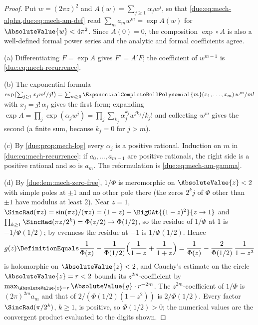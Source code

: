 \documentclass[11pt,oneside]{article}
\theoremstyle{plain}
\theoremstyle{definition}
\theoremstyle{remark}
\newcommand{\PhiUp}{\Phi}                                   %
\newcommand{\am}[1]{a_{#1}}                                 %
\begin{document}
\begin{proof}
Put \(w=(2\pi z)^{2}\) and \(A(w)=\sum_{j\ge1}\alpha_jw^{j}\), so that
\cref{due:eq:mech-alpha,due:eq:mech-am-def} read
\(\sum_m\am{m}w^{m}=\exp A(w)\) for \(\AbsoluteValue{w}<4\pi^{2}\).  Since
\(A(0)=0\), the composition \(\exp\circ A\) is also a well-defined formal
power series and the analytic and formal coefficients agree.

(a) Differentiating \(F=\exp A\) gives \(F'=A'F\); the coefficient of
\(w^{m-1}\) is \cref{due:eq:mech-recurrence}.

(b) The exponential formula
\(\exp\bigl(\sum_{j\ge1}x_jw^{j}/j!\bigr)
=\sum_{m\ge0}\ExponentialCompleteBellPolynomial{m}(x_1,\ldots,x_m)\,w^{m}/m!\)
with \(x_j=j!\,\alpha_j\) gives the first form; expanding
\(\exp A=\prod_j\exp(\alpha_jw^{j})=\prod_j\sum_{k_j}\alpha_j^{k_j}w^{jk_j}/k_j!\)
and collecting \(w^{m}\) gives the second (a finite sum, because
\(k_j=0\) for \(j>m\)).

(c) By \cref{due:prop:mech-log} every \(\alpha_j\) is a positive rational.
Induction on \(m\) in \cref{due:eq:mech-recurrence}: if
\(\am{0},\ldots,\am{m-1}\) are positive rationals, the right side is a
positive rational and so is \(\am{m}\).  The reformulation is
\cref{due:eq:mech-am-gamma}.

(d) By \cref{due:lem:mech-zero-free}, \(1/\PhiUp\) is meromorphic on
\(\AbsoluteValue{z}<2\) with simple poles at \(\pm1\) and no other pole there
(the zeros \(2^{k}j\) of \(\PhiUp\) other than \(\pm1\) have modulus at least
\(2\)).  Near \(z=1\), \(\SincRad(\pi z)=\sin(\pi z)/(\pi z)=(1-z)+\BigOAt{(1-z)^{2}}{z\to1}\)
and \(\prod_{k\ge1}\SincRad(\pi z/2^{k})=\PhiUp(z/2)\to\PhiUp(1/2)\), so the
residue of \(1/\PhiUp\) at \(1\) is \(-1/\PhiUp(1/2)\); by evenness the
residue at \(-1\) is \(1/\PhiUp(1/2)\).  Hence
\[
 g(z)\DefinitionEquals\frac1{\PhiUp(z)}-\frac1{\PhiUp(1/2)}
 \Bigl(\frac1{1-z}+\frac1{1+z}\Bigr)
 =\frac1{\PhiUp(z)}-\frac{2}{\PhiUp(1/2)}\,\frac1{1-z^{2}}
\]
is holomorphic on \(\AbsoluteValue{z}<2\), and Cauchy's estimate on the
circle \(\AbsoluteValue{z}=r<2\) bounds its \(z^{2m}\)-coefficient by
\(\max_{\AbsoluteValue{z}=r}\AbsoluteValue{g}\cdot r^{-2m}\).  The
\(z^{2m}\)-coefficient of \(1/\PhiUp\) is \((2\pi)^{2m}\am{m}\) and that of
\(2/(\PhiUp(1/2)(1-z^{2}))\) is \(2/\PhiUp(1/2)\).  Every factor
\(\SincRad(\pi/2^{k})\), \(k\ge1\), is positive, so \(\PhiUp(1/2)>0\); the
numerical values are the convergent product evaluated to the digits shown.
\end{proof}
\end{document}
